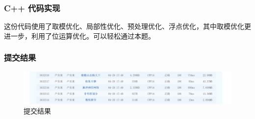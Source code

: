 		\subsubsection{C++ 代码实现}
			这份代码使用了取模优化、局部性优化、预处理优化、浮点优化，其中取模优化更进一步，利用了位运算优化。可以轻松通过本题。
			
		\subsubsection{提交结果}
			\begin{figure}[htbp]
				\centering
				\includegraphics[width=1\textwidth]{result.png}
				\caption{提交结果}
			\end{figure}